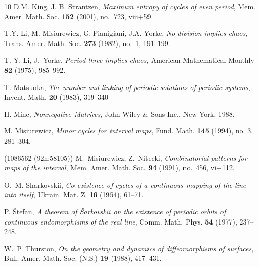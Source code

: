 \documentclass[a4paper]{amsart}
\theoremstyle{definition}
\begin{document}
\begin{thebibliography}{10}
D.M. King, J. B. Strantzen, \emph{Maximum entropy of cycles of even period}, Mem. Amer. Math. Soc. \textbf{152} (2001), no.~723, viii+59.

T.Y. Li, M. Misiurewicz, G. Pianigiani, J.A. Yorke,
  \emph{No division implies chaos}, Trans. Amer. Math. Soc. \textbf{273}
  (1982), no.~1, 191--199. 

T.-Y. Li, J.~Yorke, \emph{Period three implies chaos}, American Mathematical Monthly {\bf 82} (1975),
985--992.

T. Matsuoka, \emph{The number and linking of periodic solutions of periodic systems},
Invent. Math. {\bf 20} (1983), 319--340

H. Minc, \emph{Nonnegative Matrices}, John Wiley \& Sons Inc., New York, 1988.

M. Misiurewicz, \emph{Minor cycles for interval maps}, Fund. Math. {\bf 145} (1994), no. 3, 281--304.

 (1086562 (92h:58105))
M.~Misiurewicz, Z.~Nitecki, \emph{Combinatorial patterns for maps of the interval},
Mem. Amer. Math. Soc. \textbf{94} (1991), no.~456, vi+112.

O.~M. Sharkovskii, \emph{Co-existence of cycles of a continuous mapping of the line into itself}, Ukrain. Mat.
\u Z. \textbf{16} (1964), 61--71. 

P. \v{Stefan}, \emph{A theorem of \v{S}arkovskii on the existence of periodic orbits of continuous
endomorphisms of the real line}, Comm. Math. Phys. {\bf 54} (1977), 237--248.

W.~P. Thurston, \emph{On the geometry and dynamics of diffeomorphisms of surfaces},
Bull. Amer. Math. Soc. (N.S.) \textbf{19} (1988), 417--431. 

\end{thebibliography}
\end{document}
